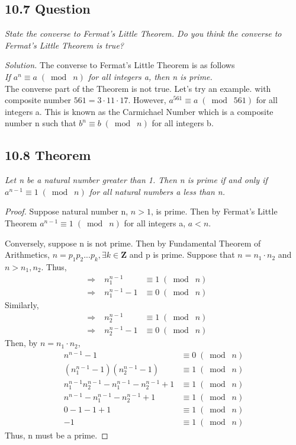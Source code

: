 \documentclass{article}
\begin{document}
\subsection*{10.7 Question} 
\quad \textit{State the converse to Fermat's Little Theorem. Do you think the converse to Fermat's Little Theorem is true?}

\textit{Solution.} The converse to Fermat's Little Theorem is as follows\\
\textit{If $a^n \equiv a \;(\bmod\; n)$ for all integers a, then n is prime.}\\
The converse part of the Theorem is not true. Let's try an example. with composite number $561 = 3 \cdot 11 \cdot 17$. However, $a^{561} \equiv a \;(\bmod\; 561)$ for all integers a. This is known as the Carmichael Number which is a composite number n such that $b^n \equiv b \;(\bmod\; n)$ for all integers b.

\subsection*{10.8 Theorem} 
\quad \textit{Let n be a natural number greater than 1. Then n is prime if and only if $a^{n-1} \equiv 1 \;(\bmod\; n)$ for all natural numbers a less than n.}

\begin{proof}
Suppose natural number n, $n>1$, is prime. Then by Fermat's Little Theorem $a^{n-1} \equiv 1 \;(\bmod\; n)$ for all integers a, $a<n$.

Conversely, suppose n is not prime. Then by Fundamental Theorem of Arithmetics, $n =p_1p_2...p_k, \exists k \in \mathbf{Z}$ and p is prime. Suppose that $n = n_1 \cdot n_2$ and $n > n_1,n_2$. Thus,
\begin{align*}
    \Longrightarrow\; & n_1^{n-1} &\equiv 1 \;(\bmod\; n)&&\\
    \Longrightarrow\; & n_1^{n-1} - 1 &\equiv 0 \;(\bmod\; n)&&
\end{align*}
Similarly,
\begin{align*}
    \Longrightarrow\; & n_2^{n-1} &\equiv 1 \;(\bmod\; n)&&\\
    \Longrightarrow\; & n_2^{n-1} - 1 &\equiv 0 \;(\bmod\; n)&&
\end{align*}
Then, by $n = n_1 \cdot n_2$,
\begin{align*}
    &&n^{n-1} - 1 &\equiv 0 \;(\bmod\; n)&&\\
    &&(n_1^{n-1} - 1)(n_2^{n-1} - 1) &\equiv 1 \;(\bmod\; n)&&\\
    &&n_1^{n-1}n_2^{n-1} - n_1^{n-1} - n_2^{n-1} + 1 &\equiv 1 \;(\bmod\; n)&&\\
    &&n^{n-1} - n_1^{n-1} - n_2^{n-1} + 1 &\equiv 1 \;(\bmod\; n)&&\\
    &&0 - 1 - 1 + 1 &\equiv 1 \;(\bmod\; n)&&\\
    && - 1 &\equiv 1 \;(\bmod\; n)&&
\end{align*}
Thus, n must be a prime.
\end{proof}
\end{document}
